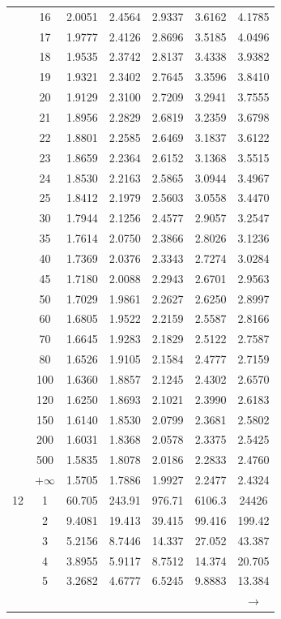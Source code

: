 \begin{minipage}{0.49\textwidth}
\begin{center}
\begin{tabular}{ccccccc}
			& 16 & 2.0051 & 2.4564 & 2.9337 & 3.6162 & 4.1785 \\
			& 17 & 1.9777 & 2.4126 & 2.8696 & 3.5185 & 4.0496 \\
			& 18 & 1.9535 & 2.3742 & 2.8137 & 3.4338 & 3.9382 \\
			& 19 & 1.9321 & 2.3402 & 2.7645 & 3.3596 & 3.8410 \\[5pt]
			& 20 & 1.9129 & 2.3100 & 2.7209 & 3.2941 & 3.7555 \\
			& 21 & 1.8956 & 2.2829 & 2.6819 & 3.2359 & 3.6798 \\
			& 22 & 1.8801 & 2.2585 & 2.6469 & 3.1837 & 3.6122 \\
			& 23 & 1.8659 & 2.2364 & 2.6152 & 3.1368 & 3.5515 \\
			& 24 & 1.8530 & 2.2163 & 2.5865 & 3.0944 & 3.4967 \\
			& 25 & 1.8412 & 2.1979 & 2.5603 & 3.0558 & 3.4470 \\
			& 30 & 1.7944 & 2.1256 & 2.4577 & 2.9057 & 3.2547 \\
			& 35 & 1.7614 & 2.0750 & 2.3866 & 2.8026 & 3.1236 \\
			& 40 & 1.7369 & 2.0376 & 2.3343 & 2.7274 & 3.0284 \\
			& 45 & 1.7180 & 2.0088 & 2.2943 & 2.6701 & 2.9563 \\[5pt]
			& 50 & 1.7029 & 1.9861 & 2.2627 & 2.6250 & 2.8997 \\
			& 60 & 1.6805 & 1.9522 & 2.2159 & 2.5587 & 2.8166 \\
			& 70 & 1.6645 & 1.9283 & 2.1829 & 2.5122 & 2.7587 \\
			& 80 & 1.6526 & 1.9105 & 2.1584 & 2.4777 & 2.7159 \\
			& 100 & 1.6360 & 1.8857 & 2.1245 & 2.4302 & 2.6570 \\
			& 120 & 1.6250 & 1.8693 & 2.1021 & 2.3990 & 2.6183 \\
			& 150 & 1.6140 & 1.8530 & 2.0799 & 2.3681 & 2.5802 \\
			& 200 & 1.6031 & 1.8368 & 2.0578 & 2.3375 & 2.5425 \\
			& 500 & 1.5835 & 1.8078 & 2.0186 & 2.2833 & 2.4760 \\
			& $+\infty$ & 1.5705 & 1.7886 & 1.9927 & 2.2477 & 2.4324 \\
			\midrule
			12 & 1 & 60.705 & 243.91 & 976.71 & 6106.3 & 24426 \\
			& 2 & 9.4081 & 19.413 & 39.415 & 99.416 & 199.42 \\
			& 3 & 5.2156 & 8.7446 & 14.337 & 27.052 & 43.387 \\
			& 4 & 3.8955 & 5.9117 & 8.7512 & 14.374 & 20.705 \\
			& 5 & 3.2682 & 4.6777 & 6.5245 & 9.8883 & 13.384 \\
			&  &  &  &  &  & $\rightarrow$ \\
		\end{tabular}
	\end{center}
\end{minipage}
